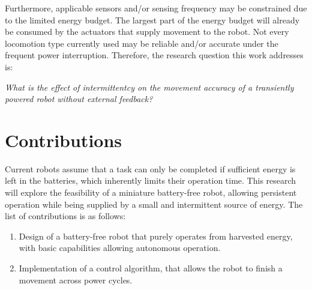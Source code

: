 Furthermore, applicable sensors and/or sensing frequency may be constrained due to the limited energy budget.
The largest part of the energy budget will already be consumed by the actuators that supply movement to the robot.
Not every locomotion type currently used may be reliable and/or accurate under the frequent power interruption.
Therefore, the research question this work addresses is:

\begin{center}
	\textit{What is the effect of intermittentcy on the movement accuracy of a transiently powered robot without external feedback?}
\end{center}

\section{Contributions}
Current robots assume that a task can only be completed if sufficient energy is left in the batteries, which inherently limits their operation time. 
This research will explore the feasibility of a miniature battery-free robot, allowing persistent operation while being supplied by a small and intermittent source of energy.
The list of contributions is as follows:

\begin{enumerate}


\item Design of a battery-free robot that purely operates from harvested energy, with basic capabilities allowing autonomous operation.

\item Implementation of a control algorithm, that allows the robot to finish a movement across power cycles.


\end{enumerate}


